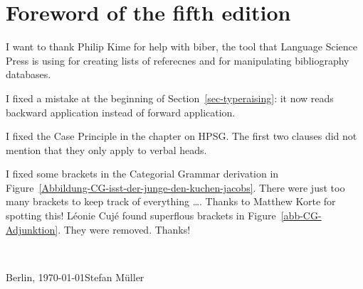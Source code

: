 
\section*{Foreword of the fifth edition}

I want to thank Philip Kime for help with biber, the tool that Language Science Press is using for
creating lists of referecnes and for manipulating bibliography databases.






I fixed a mistake at the beginning of Section~\ref{sec-typeraising}: it now reads backward
application instead of forward application.

I fixed the Case Principle in the chapter on HPSG. The first two clauses did not mention that they
only apply to verbal heads.

I fixed some brackets in the Categorial Grammar derivation in Figure~\ref{Abbildung-CG-isst-der-junge-den-kuchen-jacobs}. There were
just too many brackets to keep track of everything \ldots. Thanks to Matthew Korte for spotting this!
Léonie Cujé found superflous brackets in Figure~\ref{abb-CG-Adjunktion}. They were removed. Thanks!


~\medskip

\noindent
Berlin, \today\hfill Stefan Müller



